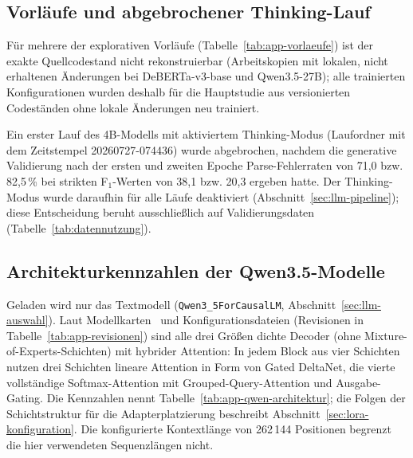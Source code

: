 \subsection{Vorläufe und abgebrochener Thinking-Lauf}
\label{app:vorlaeufe}

Für mehrere der explorativen Vorläufe (Tabelle~\ref{tab:app-vorlaeufe})
ist der exakte Quellcodestand nicht rekonstruierbar (Arbeitskopien mit
lokalen, nicht erhaltenen Änderungen bei DeBERTa-v3-base und
Qwen3.5-27B); alle trainierten Konfigurationen wurden deshalb für die
Hauptstudie aus versionierten Codeständen ohne lokale Änderungen neu
trainiert.


Ein erster Lauf des 4B-Modells mit aktiviertem Thinking-Modus
(Laufordner mit dem Zeitstempel 20260727-074436) wurde
abgebrochen, nachdem die generative Validierung nach der ersten und zweiten Epoche Parse-Fehlerraten von 71,0 bzw. 82,5\,\%
bei strikten F$_1$-Werten von 38,1 bzw. 20,3 ergeben hatte.
Der Thinking-Modus wurde daraufhin für alle Läufe deaktiviert
(Abschnitt~\ref{sec:llm-pipeline}); diese Entscheidung beruht
ausschließlich auf Validierungsdaten (Tabelle~\ref{tab:datennutzung}).

\subsection{Architekturkennzahlen der Qwen3.5-Modelle}
\label{app:qwen-architektur}

Geladen wird nur das Textmodell (\texttt{Qwen3\_5ForCausalLM},
Abschnitt~\ref{sec:llm-auswahl}).
Laut Modellkarten~\cite{qwen2026card08b,qwen2026card4b,qwen2026card27b}
und Konfigurationsdateien (Revisionen in
Tabelle~\ref{tab:app-revisionen}) sind alle drei Größen dichte Decoder
(ohne Mixture-of-Experts-Schichten) mit hybrider Attention: In jedem Block aus vier Schichten nutzen drei
Schichten lineare Attention in Form von Gated DeltaNet, die vierte
vollständige Softmax-Attention mit Grouped-Query-Attention und
Ausgabe-Gating.
Die Kennzahlen nennt Tabelle~\ref{tab:app-qwen-architektur}; die Folgen
der Schichtstruktur für die Adapterplatzierung beschreibt
Abschnitt~\ref{sec:lora-konfiguration}.
Die konfigurierte Kontextlänge von 262\,144 Positionen begrenzt die hier
verwendeten Sequenzlängen nicht.

